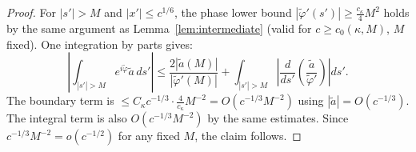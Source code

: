 \documentclass[12pt,a4paper]{amsart}
\theoremstyle{definition}
\theoremstyle{remark}
\begin{document}
\begin{proof}
For $|s'| > M$ and $|x'| \le c^{1/6}$,
the phase lower bound
$|\tilde\varphi'(s')| \ge \tfrac{c_\kappa}{4}M^2$
holds by the same argument as
Lemma~\ref{lem:intermediate}
(valid for $c \ge c_0(\kappa,M)$, $M$ fixed).
One integration by parts gives:
\[
\left|\int_{|s'|>M}
e^{i\tilde\varphi}\tilde{a}\,ds'\right|
\le \frac{2|\tilde{a}(M)|}{|\tilde\varphi'(M)|}
+ \int_{|s'|>M}
\left|\frac{d}{ds'}\!\left(
\frac{\tilde{a}}{\tilde\varphi'}\right)\right|ds'.
\]
The boundary term is
$\le C_\kappa c^{-1/3} \cdot \tfrac{4}{c_\kappa}M^{-2}
= O(c^{-1/3}M^{-2})$
using $|\tilde{a}| = O(c^{-1/3})$.
The integral term is also $O(c^{-1/3}M^{-2})$
by the same estimates.
Since $c^{-1/3}M^{-2} = o(c^{-1/2})$
for any fixed $M$, the claim follows.
\end{proof}
\end{document}
